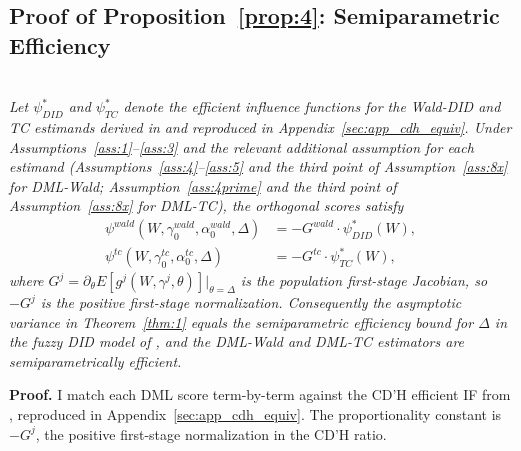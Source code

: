 \subsection{Proof of Proposition~\ref{prop:4}: Semiparametric Efficiency}\label{sec:app_proofs_prop4}

\begin{propproof}

\noindent \\
\textit{Let $\psi^{*}_{DID}$ and $\psi^{*}_{TC}$ denote the efficient influence functions for the Wald-DID and TC estimands derived in \citet[Supplementary Data, p.~45]{fuzzy2018} and reproduced in Appendix~\ref{sec:app_cdh_equiv}. Under Assumptions~\ref{ass:1}--\ref{ass:3} and the relevant additional assumption for each estimand (Assumptions~\ref{ass:4}--\ref{ass:5} and the third point of Assumption~\ref{ass:8x} for DML-Wald; Assumption~\ref{ass:4prime} and the third point of Assumption~\ref{ass:8x} for DML-TC), the orthogonal scores satisfy}
\begin{align*}
    \psi^{wald}(W,\gamma^{wald}_0,\alpha^{wald}_0,\Delta)
    &= -G^{wald}\cdot\psi^{*}_{DID}(W), \\
    \psi^{tc}(W,\gamma^{tc}_0,\alpha^{tc}_0,\Delta)
    &= -G^{tc}\cdot\psi^{*}_{TC}(W),
\end{align*}
\noindent\textit{where $G^j=\partial_\theta E[g^j(W,\gamma^j,\theta)]|_{\theta=\Delta}$ is the population first-stage Jacobian, so $-G^j$ is the positive first-stage normalization. Consequently the asymptotic variance in Theorem~\ref{thm:1} equals the semiparametric efficiency bound for $\Delta$ in the fuzzy DID model of \citet{fuzzy2018}, and the DML-Wald and DML-TC estimators are semiparametrically efficient.}

\medskip
\noindent\textbf{Proof.} I match each DML score term-by-term against the CD'H efficient IF from \citet[Supplementary Data, p.~45, Equations 63--65]{fuzzy2018}, reproduced in Appendix~\ref{sec:app_cdh_equiv}. The proportionality constant is $-G^j$, the positive first-stage normalization in the CD'H ratio.


\end{propproof}
